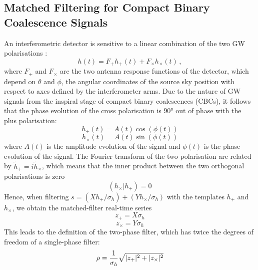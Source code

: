 \documentclass[binding=0.6cm, LaM]{sapthesis}
\begin{document}
\subsection{Matched Filtering for Compact Binary Coalescence Signals}
\label{subsec:mfcbc}
	An interferometric detector is sensitive to a linear combination 
	of the two GW polarisations \cite{26}: 
        \begin{equation}
          h(t) = F_{+}h_{+} (t) + F_{\times}h_{\times}(t)\,,
        \end{equation}
	where $F_{+}$ and $F_{\times}$ are the two antenna response functions of the detector, 
	which depend on $\theta$ and $\phi$, 
	the angular coordinates of the source sky position with respect to axes defined by the interferometer arms. 
	Due to the nature of GW signals from the inspiral stage of compact binary coalescences (CBCs), 
	it follows that the phase evolution of the cross polarisation is $\ang{90}$ out of phase with the plus polarisation:
        \begin{equation}
          h_{+}(t) = A(t) \cos (\phi (t))
        \end{equation}
        \begin{equation}
          h_{\times}(t) = A(t) \sin (\phi (t))
        \end{equation}
	where $A(t)$ is the amplitude evolution of the signal 
	and $\phi(t)$ is the phase evolution of the signal. 
	The Fourier transform of the two polarisation are related by $\tilde h_{+} = i\tilde{h}_{\times}$, 
	which means that the inner product between the two orthogonal polarisations is zero 
        \begin{equation}
          (h_{\times}|h_{+}) = 0
        \end{equation}
	Hence, when filtering $s = (Xh_{+}/\sigma_{h}) + (Y h_{\times}/\sigma_{h})$ 
	with the templates $h_{+}$ and $h_{\times}$, we obtain the matched-filter real-time series
        \begin{equation}
          z_{+} = X\sigma_{h}
        \end{equation}
        \begin{equation}
          z_{\times} = Y \sigma_{h} 
        \end{equation}
	This leads to the definition of the two-phase filter, 
	which has twice the degrees of freedom of a single-phase filter:
        \begin{equation}
          \rho = {1 \over \sigma_h} \sqrt{|z_{+}| ^2+ |z_{\times}|^2}
        \end{equation}
\end{document}
